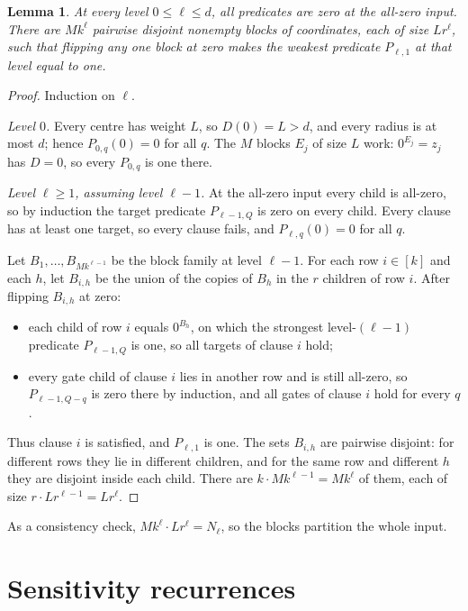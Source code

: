 \documentclass[11pt]{article}
\newtheorem{lemma}[theorem]{Lemma}
\theoremstyle{definition}
\theoremstyle{remark}
\begin{document}
\begin{lemma}\label{lem:blocks}
At every level \(0\le\ell\le d\), all predicates are zero at the
all-zero input. There are \(Mk^\ell\) pairwise disjoint nonempty blocks
of coordinates, each of size \(Lr^\ell\), such that flipping any one
block at zero makes the weakest predicate \(P_{\ell,1}\) at that level equal to one.
\end{lemma}
\begin{proof}
Induction on \(\ell\).

\emph{Level \(0\).} Every centre has weight \(L\), so \(D(0)=L>d\), and every
radius is at most \(d\); hence \(P_{0,q}(0)=0\) for all \(q\). The \(M\)
blocks \(E_j\) of size \(L\) work: \(0^{E_j}=z_j\) has \(D=0\), so every
\(P_{0,q}\) is one there.

\emph{Level \(\ell\ge1\), assuming level \(\ell-1\).}
At the all-zero input every child is all-zero, so by induction the target
predicate \(P_{\ell-1,Q}\) is zero on every child. Every clause has at least
one target, so every clause fails, and \(P_{\ell,q}(0)=0\) for all \(q\).

Let \(B_1,\ldots,B_{Mk^{\ell-1}}\) be the block family at level \(\ell-1\).
For each row \(i\in[k]\) and each \(h\), let \(B_{i,h}\) be the union of the
copies of \(B_h\) in the \(r\) children of row \(i\). After flipping
\(B_{i,h}\) at zero:
\begin{itemize}[leftmargin=2em]
\item each child of row \(i\) equals \(0^{B_h}\), on which the strongest
level-\((\ell-1)\) predicate \(P_{\ell-1,Q}\) is one, so all
targets of clause \(i\) hold;
\item every gate child of clause \(i\) lies in another row and is still
all-zero, so \(P_{\ell-1,Q-q}\) is zero there by induction, and all gates
of clause \(i\) hold for every \(q\).
\end{itemize}
Thus clause \(i\) is satisfied, and \(P_{\ell,1}\) is one.
The sets \(B_{i,h}\) are pairwise disjoint: for different rows they lie in
different children, and for the same row and different \(h\) they are disjoint
inside each child. There are \(k\cdot Mk^{\ell-1}=Mk^\ell\) of them, each of
size \(r\cdot Lr^{\ell-1}=Lr^\ell\).
\end{proof}

As a consistency check, \(Mk^\ell\cdot Lr^\ell=N_\ell\), so the blocks
partition the whole input.

\section{Sensitivity recurrences}
\label{sec:recurrences}
\end{document}
